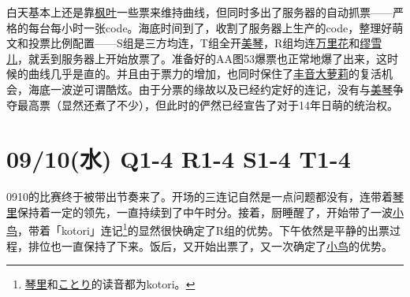 
白天基本上还是靠\uline{枫叶}一些票来维持曲线，但同时多出了服务器的自动抓票——严格的每台每小时一张code。海底时间到了，收割了服务器上生产的code，整理好萌文和投票比例配置——S组是三方均连，T组全开\uline{美琴}，R组均连\uline{万里花}和\uline{缪雪儿}，就丢到服务器上开始放票了。准备好的AA图53爆票也正常地爆了出来，这时候的曲线几乎是直的。并且由于票力的增加，也同时保住了\uline{丰音大萝莉}的复活机会，海底一波逆可谓酷炫。由于分票的缘故以及已经约定好的连记，没有与\uline{美琴}争夺最高票（显然还煮了不少），但此时的俨然已经宣告了对于14年日萌的统治权。

\section{09/10(水) Q1-4 R1-4 S1-4 T1-4}


0910的比赛终于被带出节奏来了。开场的三连记自然是一点问题都没有，连带着\uline{琴里}保持着一定的领先，一直持续到了中午时分。接着，厨睡醒了，开始带了一波\uline{小鸟}，带着「kotori」连记\footnote{\uline{琴里}和\uline{ことり}的读音都为kotori。}的显然很快确定了R组的优势。下午依然是平静的出票过程，排位也一直保持了下来。饭后，又开始出票了，又一次确定了\uline{小鸟}的优势。

